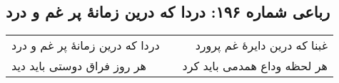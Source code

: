 \begin{center}
\section*{رباعی شماره ۱۹۶: دردا که درین زمانهٔ پر غم و درد}
\label{sec:sh196}
\begin{longtable}{l p{0.5cm} r}
دردا که درین زمانهٔ پر غم و درد
&&
غبنا که درین دایرهٔ غم پرورد
\\
هر روز فراق دوستی باید دید
&&
هر لحظه وداع همدمی باید کرد
\\
\end{longtable}
\end{center}
